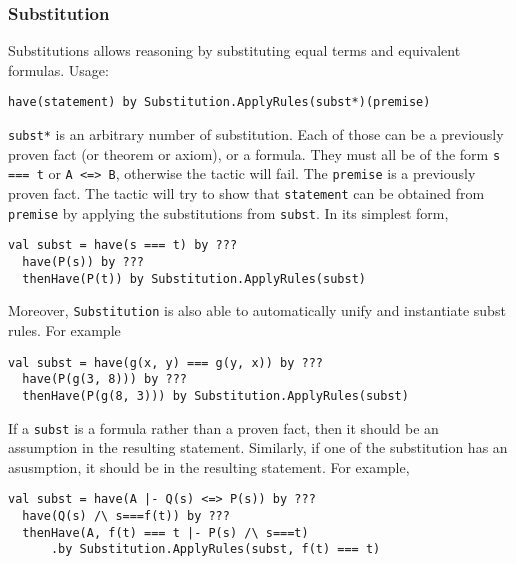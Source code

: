 \subsubsection*{Substitution}
Substitutions allows reasoning by substituting equal terms and equivalent formulas. Usage:
\begin{lstlisting}[language=lisa]
  have(statement) by Substitution.ApplyRules(subst*)(premise)
\end{lstlisting}

\lstinline|subst*| is an arbitrary number of substitution. Each of those can be a previously proven fact (or theorem or axiom), or a formula. They must all be of the form \lstinline|s === t| or \lstinline|A <=> B|, otherwise the tactic will fail. The \lstinline|premise| is a previously proven fact. The tactic will try to show that \lstinline|statement| can be obtained from \lstinline|premise| by applying the substitutions from \lstinline|subst|. In its simplest form,
\begin{lstlisting}[language=lisa]
  val subst = have(s === t) by ???
  have(P(s)) by ???
  thenHave(P(t)) by Substitution.ApplyRules(subst)
\end{lstlisting}

Moreover, \lstinline|Substitution| is also able to  automatically unify and instantiate subst rules. For example

\begin{lstlisting}[language=lisa]
  val subst = have(g(x, y) === g(y, x)) by ???
  have(P(g(3, 8))) by ???
  thenHave(P(g(8, 3))) by Substitution.ApplyRules(subst)
\end{lstlisting}

If a \lstinline|subst| is a formula rather than a proven fact, then it should be an assumption in the resulting statement. Similarly, if one of the substitution has an asusmption, it should be in the resulting statement. For example,

\begin{lstlisting}[language=lisa]
  val subst = have(A |- Q(s) <=> P(s)) by ???
  have(Q(s) /\ s===f(t)) by ???
  thenHave(A, f(t) === t |- P(s) /\ s===t) 
      .by Substitution.ApplyRules(subst, f(t) === t)
\end{lstlisting}